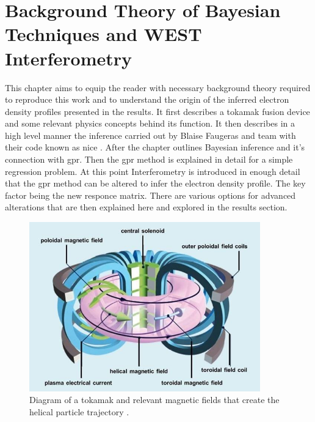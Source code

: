 \chapter{Background Theory of Bayesian Techniques and WEST Interferometry}

This chapter aims to equip the reader with necessary background theory required to reproduce this work and to understand the origin of the inferred electron density profiles presented in the results. It first describes a tokamak fusion device and some relevant physics concepts behind its function. It then describes in a high level manner the inference carried out by Blaise Faugeras and team with their code known as \gls{nice} \cite{nice}. After the chapter outlines Bayesian inference and it's connection with \gls{gpr}. Then the \gls{gpr} method is explained in detail for a simple regression problem. At this point Interferometry is introduced in enough detail that the \gls{gpr} method can be altered to infer the electron density profile. The key factor being the new responce matrix. There are various options for advanced alterations that are then explained here and explored in the results section.

\begin{figure}
  \centering
  \includegraphics[width=10cm]{images/tokamak.jpg}
  \caption{Diagram of a tokamak and relevant magnetic fields that create the helical particle trajectory \cite{tokamakSchema}.}
  \label{fig:tokamakSchema}
\end{figure}


